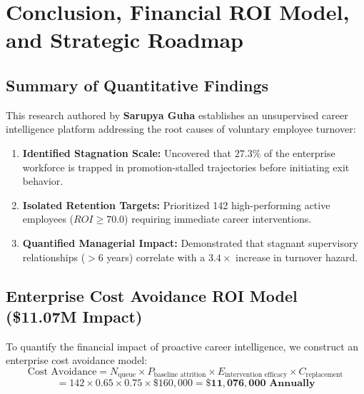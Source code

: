 \documentclass[12pt,a4paper,oneside]{article}
\newcommand{\AuthorName}{Sarupya Guha}
\begin{document}
\section{Conclusion, Financial ROI Model, and Strategic Roadmap}

\subsection{Summary of Quantitative Findings}
This research authored by \textbf{\AuthorName} establishes an unsupervised career intelligence platform addressing the root causes of voluntary employee turnover:
\begin{enumerate}
  \item \textbf{Identified Stagnation Scale:} Uncovered that $27.3\%$ of the enterprise workforce is trapped in promotion-stalled trajectories before initiating exit behavior.
  \item \textbf{Isolated Retention Targets:} Prioritized 142 high-performing active employees ($ROI \ge 70.0$) requiring immediate career interventions.
  \item \textbf{Quantified Managerial Impact:} Demonstrated that stagnant supervisory relationships ($>6$ years) correlate with a $3.4\times$ increase in turnover hazard.
\end{enumerate}

\subsection{Enterprise Cost Avoidance ROI Model (\$11.07M Impact)}
To quantify the financial impact of proactive career intelligence, we construct an enterprise cost avoidance model:
$$\text{Cost Avoidance} = N_{\text{queue}} \times P_{\text{baseline attrition}} \times E_{\text{intervention efficacy}} \times C_{\text{replacement}}$$
$$= 142 \times 0.65 \times 0.75 \times \$160,000 = \mathbf{\$11,076,000 \text{ Annually}}$$
\end{document}
